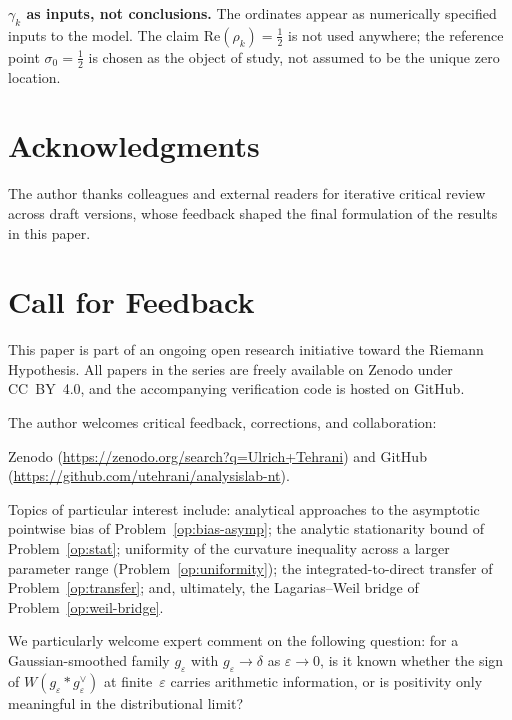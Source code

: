 \documentclass[11pt]{article}
\begin{document}
\textbf{$\gamma_k$ as inputs, not conclusions.}
The ordinates appear as numerically specified inputs to the model.
The claim $\mathrm{Re}(\rho_k)=\tfrac12$ is not used anywhere; the
reference point $\sigma_0=\tfrac12$ is chosen as the object of study,
not assumed to be the unique zero location.

\section*{Acknowledgments}

The author thanks colleagues and external readers for iterative
critical review across draft versions, whose feedback shaped the
final formulation of the results in this paper.

\section*{Call for Feedback}

This paper is part of an ongoing open research initiative toward the
Riemann Hypothesis.
All papers in the series are freely available on Zenodo under CC~BY~4.0,
and the accompanying verification code is hosted on GitHub.

The author welcomes critical feedback, corrections, and collaboration:
{\sloppy
Zenodo (\url{https://zenodo.org/search?q=Ulrich+Tehrani}) and GitHub
(\url{https://github.com/utehrani/analysislab-nt}).
\par}

Topics of particular interest include: analytical approaches to the
asymptotic pointwise bias of Problem~\ref{op:bias-asymp}; the analytic
stationarity bound of Problem~\ref{op:stat}; uniformity of the
curvature inequality across a larger parameter range
(Problem~\ref{op:uniformity}); the integrated-to-direct transfer of
Problem~\ref{op:transfer}; and, ultimately, the Lagarias--Weil bridge
of Problem~\ref{op:weil-bridge}.

We particularly welcome expert comment on the following question:
for a Gaussian-smoothed family $g_\varepsilon$ with
$g_\varepsilon\to\delta$ as $\varepsilon\to 0$, is it known whether
the sign of $W(g_\varepsilon * g_\varepsilon^\vee)$ at
finite~$\varepsilon$ carries arithmetic information, or is positivity
only meaningful in the distributional limit?
\end{document}
